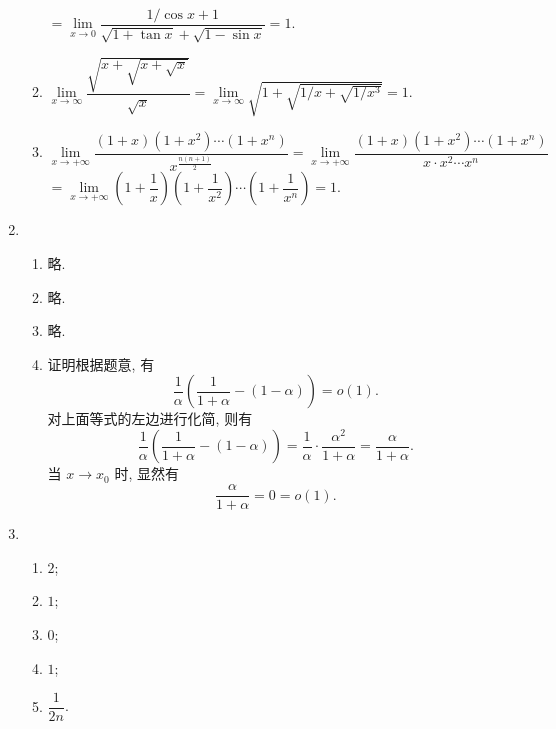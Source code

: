\begin{enumerate}
\begin{enumerate}[(1)]
                $= \lim\limits_{x\to0}\dfrac{1/\cos x + 1}{\sqrt{1+\tan x} + \sqrt{1-\sin x}} = 1$.
            \item %
                $\lim\limits_{x\to\infty}\dfrac{\sqrt{x + \sqrt{x + \sqrt{x}}}}{\sqrt{x}} = \lim\limits_{x\to\infty}\sqrt{1 + \sqrt{1/x + \sqrt{1/x^3}}} = 1$.
            \item %
                $\lim\limits_{x\to+\infty}\dfrac{(1+x)(1+x^2)\cdots(1+x^n)}{x^{\frac{n(n+1)}{2}}} = \lim\limits_{x\to+\infty} \dfrac{(1+x)(1+x^2) \cdots (1+x^n)}{x \cdot x^2 \cdots x^n}$ \\
                $= \lim\limits_{x\to+\infty} \left(1 + \dfrac{1}{x}\right)\left(1 + \dfrac{1}{x^2}\right) \cdots \left(1 + \dfrac{1}{x^n}\right) = 1$.
        \end{enumerate}
    \item %
        \begin{enumerate}[(1)]
            \item %
                略.
            \item %
                略.
            \item %
                略.
            \item %
                {\heiti 证明}\quad 根据题意, 有
                \[
                    \frac1\alpha\left(\frac{1}{1+\alpha} - (1-\alpha)\right) = o(1).    
                \]
                对上面等式的左边进行化简, 则有
                \[
                    \frac1\alpha\left(\frac{1}{1+\alpha} - (1-\alpha)\right) = \frac1\alpha \cdot \frac{\alpha^2}{1+\alpha} = \frac{\alpha}{1 + \alpha}.
                \]
                当 $x \to x_0$ 时, 显然有
                \[
                    \frac{\alpha}{1 + \alpha} = 0 = o(1).  
                \]
        \end{enumerate}
    \item %
        \begin{enumerate}[(1)]
            \item %
                $2$;
            \item %
                $1$;
            \item %
                $0$;
            \item %
                $1$;
            \item %
                $\dfrac{1}{2n}$.
        \end{enumerate}
\end{enumerate}

% 
